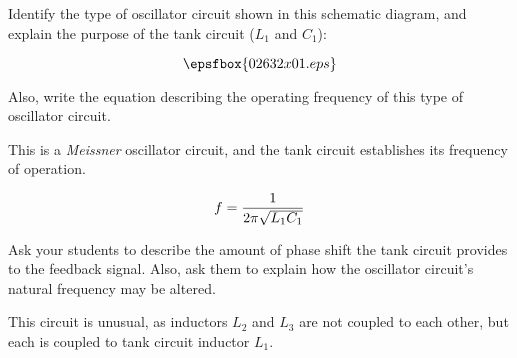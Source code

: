 

Identify the type of oscillator circuit shown in this schematic diagram, and explain the purpose of the tank circuit ($L_1$ and $C_1$):

$$\epsfbox{02632x01.eps}$$

Also, write the equation describing the operating frequency of this type of oscillator circuit.







This is a {\it Meissner} oscillator circuit, and the tank circuit establishes its frequency of operation.

$$f = {1 \over {2 \pi \sqrt{L_1 C_1}}}$$







Ask your students to describe the amount of phase shift the tank circuit provides to the feedback signal.  Also, ask them to explain how the oscillator circuit's natural frequency may be altered.

This circuit is unusual, as inductors $L_2$ and $L_3$ are not coupled to each other, but each is coupled to tank circuit inductor $L_1$.




